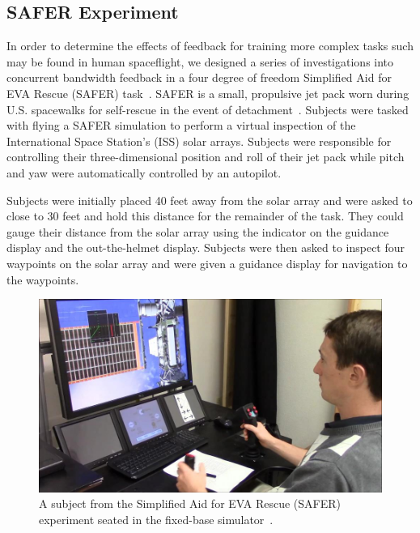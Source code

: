 \subsection{SAFER Experiment} \label{safersection}
In order to determine the effects of feedback for training more complex tasks such may be found in human spaceflight, we designed a series of investigations into concurrent bandwidth feedback in a four degree of freedom Simplified Aid for EVA Rescue (SAFER) task~\citep{karasinski_real-time_2016,karasinski_development_2016,karasinski_real-time_2017}.
SAFER is a small, propulsive jet pack worn during U.S. spacewalks for self-rescue in the event of detachment~\citep{Vassigh1998}.
Subjects were tasked with flying a SAFER simulation to perform a virtual inspection of the International Space Station's (ISS) solar arrays.
Subjects were responsible for controlling their three-dimensional position and roll of their jet pack while pitch and yaw were automatically controlled by an autopilot.

Subjects were initially placed 40 feet away from the solar array and were asked to close to 30 feet and hold this distance for the remainder of the task.
They could gauge their distance from the solar array using the indicator on the guidance display and the out-the-helmet display.
Subjects were then asked to inspect four waypoints on the solar array and were given a guidance display for navigation to the waypoints.

\begin{figure}[tbp]
    \begin{center}
        \includegraphics[width=\linewidth]{figures/AR/SAFER_DangerChris.jpg}
        \caption[Simplified Aid for EVA Rescue (SAFER) experiment subject seated in the fixed-base simulator]{A subject from the Simplified Aid for EVA Rescue (SAFER) experiment seated in the fixed-base simulator~\citep{karasinski_real-time_2016}.}
        \label{figure:safersim}
    \end{center}
\end{figure}

